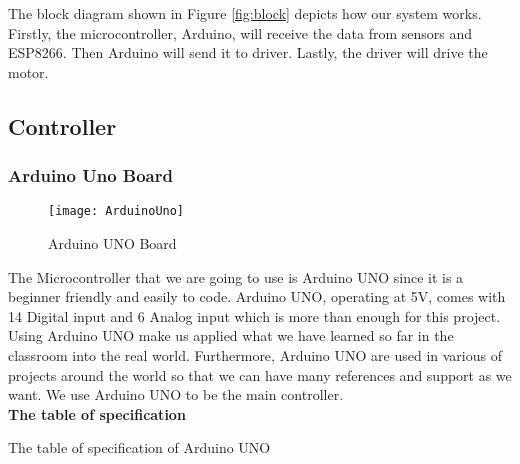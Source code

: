 \documentclass[12pt]{article}
\begin{document}
The block diagram shown in Figure \ref{fig:block} depicts how our system works. Firstly, the microcontroller, Arduino, will receive the data from sensors and ESP8266. Then Arduino will send it to driver. Lastly, the driver will drive the motor.

\subsection{Controller} \label{sub:controller}

\subsubsection{Arduino Uno Board} \label{subsub:arduino}

\begin{figure}[H]
	\centering
	\texttt{[image: ArduinoUno]}
	\caption{Arduino UNO Board} \label{fig:arduino}
\end{figure}

The Microcontroller that we are going to use is Arduino UNO since it is a beginner friendly and easily to code. Arduino UNO, operating at 5V, comes with 14 Digital input and 6 Analog input which is more than enough for this project. Using Arduino UNO make us applied what we have learned so far in the classroom into the real world. Furthermore, Arduino UNO are used in various of projects around the world so that we can have many references and support as we want. We use Arduino UNO to be the main controller.\\

\bfseries{The table of specification}

\begin{table}[H]
	\centering
	\label{tab:arduino}
	\caption{The table of specification of Arduino UNO}
\end{table}
\end{document}
